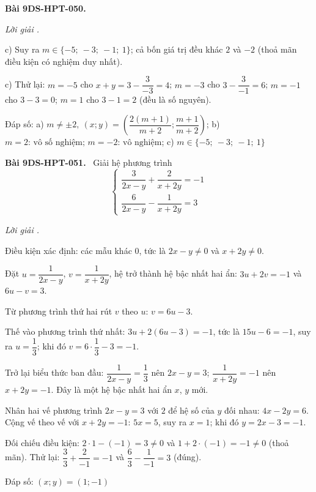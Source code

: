 \documentclass[12pt,a4paper]{article}
\newenvironment{problem}[1][]{\par\medskip\noindent\textbf{Bài #1.}\ }{\par}
\newenvironment{solution}[1][]{\par\noindent\textit{Lời giải #1.}\par}{\par}
\begin{document}
\begin{problem}[9DS-HPT-050]
\begin{solution}
c) Suy ra $m \in \{-5;\ -3;\ -1;\ 1\}$; cả bốn giá trị đều khác $2$ và $-2$ (thoả mãn điều kiện có nghiệm duy nhất).

c) Thử lại: $m = -5$ cho $x + y = 3 - \dfrac{3}{-3} = 4$; $m = -3$ cho $3 - \dfrac{3}{-1} = 6$; $m = -1$ cho $3 - 3 = 0$; $m = 1$ cho $3 - 1 = 2$ (đều là số nguyên).

Đáp số: a) $\boxed{m \neq \pm 2,\ (x; y) = \left(\dfrac{2(m + 1)}{m + 2}; \dfrac{m + 1}{m + 2}\right)}$; b) $\boxed{m = 2 \text{: vô số nghiệm; } m = -2 \text{: vô nghiệm}}$; c) $\boxed{m \in \{-5;\ -3;\ -1;\ 1\}}$
\end{solution}
\end{problem}

\begin{problem}[9DS-HPT-051]
Giải hệ phương trình
\[ \begin{cases} \dfrac{3}{2x - y} + \dfrac{2}{x + 2y} = -1 \\ \dfrac{6}{2x - y} - \dfrac{1}{x + 2y} = 3 \end{cases} \]

\begin{solution}
Điều kiện xác định: các mẫu khác $0$, tức là $2x - y \neq 0$ và $x + 2y \neq 0$.

Đặt $u = \dfrac{1}{2x - y}$, $v = \dfrac{1}{x + 2y}$, hệ trở thành hệ bậc nhất hai ẩn: $3u + 2v = -1$ và $6u - v = 3$.

Từ phương trình thứ hai rút $v$ theo $u$: $v = 6u - 3$.

Thế vào phương trình thứ nhất: $3u + 2(6u - 3) = -1$, tức là $15u - 6 = -1$, suy ra $u = \dfrac{1}{3}$; khi đó $v = 6 \cdot \dfrac{1}{3} - 3 = -1$.

Trở lại biểu thức ban đầu: $\dfrac{1}{2x - y} = \dfrac{1}{3}$ nên $2x - y = 3$; $\dfrac{1}{x + 2y} = -1$ nên $x + 2y = -1$. Đây là một hệ bậc nhất hai ẩn $x$, $y$ mới.

Nhân hai vế phương trình $2x - y = 3$ với $2$ để hệ số của $y$ đối nhau: $4x - 2y = 6$. Cộng vế theo vế với $x + 2y = -1$: $5x = 5$, suy ra $x = 1$; khi đó $y = 2x - 3 = -1$.

Đối chiếu điều kiện: $2 \cdot 1 - (-1) = 3 \neq 0$ và $1 + 2 \cdot (-1) = -1 \neq 0$ (thoả mãn). Thử lại: $\dfrac{3}{3} + \dfrac{2}{-1} = -1$ và $\dfrac{6}{3} - \dfrac{1}{-1} = 3$ (đúng).

Đáp số: $\boxed{(x; y) = (1; -1)}$
\end{solution}
\end{problem}
\end{document}
